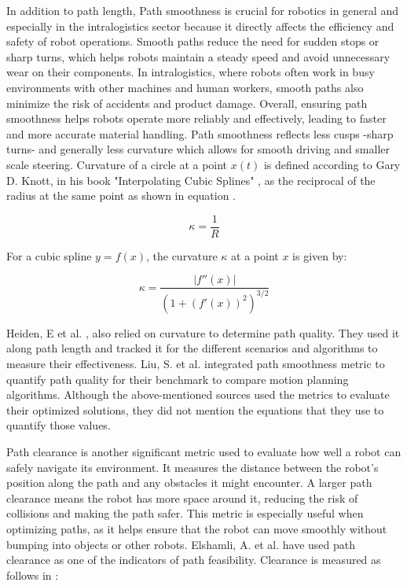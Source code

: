 In addition to path length, Path smoothness is crucial for robotics in general and especially 
in the intralogistics sector because it directly affects the efficiency and safety of robot 
operations. Smooth paths reduce the need for sudden stops or sharp turns, which helps robots 
maintain a steady speed and avoid unnecessary wear on their components. In intralogistics, 
where robots often work in busy environments with other machines and human workers, smooth 
paths also minimize the risk of accidents and product damage. Overall, ensuring path 
smoothness helps robots operate more reliably and effectively, leading to faster and 
more accurate material handling. Path smoothness reflects less cusps -sharp turns- and generally
less curvature which allows for smooth driving and smaller scale steering.
Curvature of a circle at a point \(x(t)\) is defined according to Gary D. Knott, in his book 
"Interpolating Cubic Splines" \cite{R34}, as the reciprocal of the radius at the same point as shown in
equation .

\begin{equation}
    \kappa = \frac{1}{R}
    \label{kurv}
\end{equation}

For a cubic spline \( y = f(x) \), the curvature \( \kappa \) at a point \( x \) is given by:

\begin{equation}
\kappa = \frac{|f''(x)|}{\left(1 + \left(f'(x)\right)^2\right)^{3/2}}
\end{equation}

Heiden, E et al. \cite{R23}, also relied on curvature to determine path quality. They used it along 
path length and tracked it for the different scenarios and algorithms to measure their effectiveness.
Liu, S. et al. integrated path smoothness metric to quantify path quality for their benchmark to compare
motion planning algorithms\cite{R35}.
Although the above-mentioned sources used the metrics to evaluate their optimized solutions,
they did not mention the equations that they use to quantify those values.

Path clearance is another significant metric used to evaluate how well a robot can safely navigate 
its environment. It measures the distance between the robot's position along the path and any obstacles 
it might encounter. A larger path clearance means the robot has more space around it, reducing the risk 
of collisions and making the path safer. This metric is especially useful when optimizing paths, as it 
helps ensure that the robot can move smoothly without bumping into objects or other robots. 
Elshamli, A. et al. \cite{R17} have used path clearance as one of the indicators of path feasibility.
Clearance is measured as follows in :

